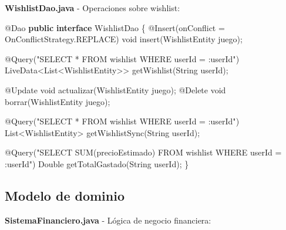 \documentclass[
  spanish,
  11pt,
  paper=a4,
  ,captions=tableheading
]{scrartcl}
\newenvironment{Shaded}{}{}
\newcommand{\AttributeTok}[1]{\textcolor[rgb]{0.49,0.56,0.16}{#1}}
\newcommand{\BuiltInTok}[1]{\textcolor[rgb]{0.00,0.50,0.00}{#1}}
\newcommand{\DataTypeTok}[1]{\textcolor[rgb]{0.56,0.13,0.00}{#1}}
\newcommand{\FunctionTok}[1]{\textcolor[rgb]{0.02,0.16,0.49}{#1}}
\newcommand{\KeywordTok}[1]{\textcolor[rgb]{0.00,0.44,0.13}{\textbf{#1}}}
\newcommand{\NormalTok}[1]{#1}
\newcommand{\OperatorTok}[1]{\textcolor[rgb]{0.40,0.40,0.40}{#1}}
\newcommand{\StringTok}[1]{\textcolor[rgb]{0.25,0.44,0.63}{#1}}
\begin{document}
\textbf{WishlistDao.java} - Operaciones sobre wishlist:

\begin{Shaded}
\begin{Highlighting}[]
\AttributeTok{@Dao}
\KeywordTok{public} \KeywordTok{interface}\NormalTok{ WishlistDao }\OperatorTok{\{}
    \AttributeTok{@Insert}\OperatorTok{(}\NormalTok{onConflict }\OperatorTok{=}\NormalTok{ OnConflictStrategy}\OperatorTok{.}\FunctionTok{REPLACE}\OperatorTok{)}
    \DataTypeTok{void} \FunctionTok{insert}\OperatorTok{(}\NormalTok{WishlistEntity juego}\OperatorTok{);}

    \AttributeTok{@Query}\OperatorTok{(}\StringTok{"SELECT * FROM wishlist WHERE userId = :userId"}\OperatorTok{)}
\NormalTok{    LiveData}\OperatorTok{\textless{}}\BuiltInTok{List}\OperatorTok{\textless{}}\NormalTok{WishlistEntity}\OperatorTok{\textgreater{}\textgreater{}} \FunctionTok{getWishlist}\OperatorTok{(}\BuiltInTok{String}\NormalTok{ userId}\OperatorTok{);}

    \AttributeTok{@Update} \DataTypeTok{void} \FunctionTok{actualizar}\OperatorTok{(}\NormalTok{WishlistEntity juego}\OperatorTok{);}
    \AttributeTok{@Delete} \DataTypeTok{void} \FunctionTok{borrar}\OperatorTok{(}\NormalTok{WishlistEntity juego}\OperatorTok{);}

    \AttributeTok{@Query}\OperatorTok{(}\StringTok{"SELECT * FROM wishlist WHERE userId = :userId"}\OperatorTok{)}
    \BuiltInTok{List}\OperatorTok{\textless{}}\NormalTok{WishlistEntity}\OperatorTok{\textgreater{}} \FunctionTok{getWishlistSync}\OperatorTok{(}\BuiltInTok{String}\NormalTok{ userId}\OperatorTok{);}

    \AttributeTok{@Query}\OperatorTok{(}\StringTok{"SELECT SUM(precioEstimado) FROM wishlist WHERE userId = :userId"}\OperatorTok{)}
    \BuiltInTok{Double} \FunctionTok{getTotalGastado}\OperatorTok{(}\BuiltInTok{String}\NormalTok{ userId}\OperatorTok{);}
\OperatorTok{\}}
\end{Highlighting}
\end{Shaded}

\hypertarget{modelo-de-dominio}{%
\subsection{Modelo de dominio}\label{modelo-de-dominio}}

\textbf{SistemaFinanciero.java} - Lógica de negocio financiera:
\end{document}
